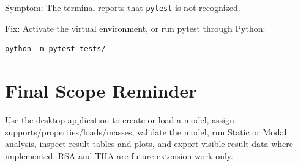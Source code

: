 \documentclass[11pt,a4paper]{article}
\begin{document}
Symptom: The terminal reports that \texttt{pytest} is not recognized.

Fix: Activate the virtual environment, or run pytest through Python:
\begin{verbatim}
python -m pytest tests/
\end{verbatim}

\section{Final Scope Reminder}

Use the desktop application to create or load a model, assign supports/properties/loads/masses, validate the model, run Static or Modal analysis, inspect result tables and plots, and export visible result data where implemented. RSA and THA are future-extension work only.
\end{document}
